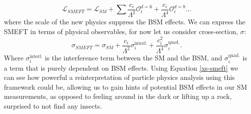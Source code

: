 \begin{equation}\label{lag-smeft}
    \mathcal{L}_{SMEFT}=\mathcal{L}_{SM}+ \sum \frac{c_i}{\Lambda^2}\mathcal{O}^{d=6}_i +\frac{c_i}{\Lambda^4}\mathcal{O}^{d=8}_i \ldots
\end{equation}
where the scale of the new physics suppress the BSM effects. We can express the SMEFT in terms of physical observables, for now let us consider cross-section, $\sigma$:
\begin{equation}\label{xs-smeft}
    \sigma_{SMEFT} = \sigma_{SM}+\frac{c_i}{\Lambda^2}\sigma_i^{\text{interf.}}+\frac{c^2_i}{\Lambda^4}\sigma_i^{\text{quad.}}.
\end{equation}
Where $\sigma_i^{\text{interf.}}$ is the interference term between the SM and the BSM, and $\sigma_i^{\text{quad.}}$ is a term that is purely dependent on BSM effects. Using Equation \ref{xs-smeft} we can see how powerful a reinterpretation of particle physics analysis using this framework could be, allowing us to gain hints of potential BSM effects in our SM measurements, as opposed to feeling around in the dark or lifting up a rock, surprised to not find any insects. 
